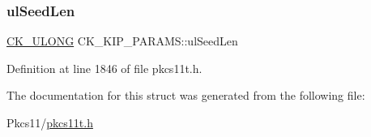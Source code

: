 \subsubsection{\texorpdfstring{ul\+Seed\+Len}{ulSeedLen}}
{\footnotesize\ttfamily \hyperlink{pkcs11t_8h_a35181858a3b7a0a81f49d180d8f446ef}{C\+K\+\_\+\+U\+L\+O\+NG} C\+K\+\_\+\+K\+I\+P\+\_\+\+P\+A\+R\+A\+M\+S\+::ul\+Seed\+Len}



Definition at line 1846 of file pkcs11t.\+h.



The documentation for this struct was generated from the following file\+:\begin{DoxyCompactItemize}
\item 
Pkcs11/\hyperlink{pkcs11t_8h}{pkcs11t.\+h}\end{DoxyCompactItemize}

